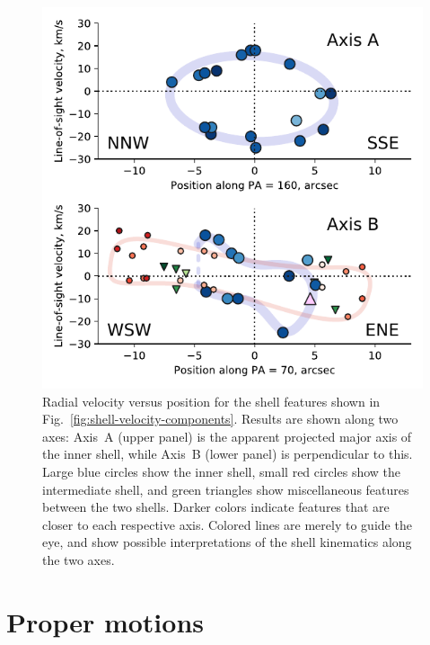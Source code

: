 \documentclass[useAMS, usenatbib]{mnras}
\begin{document}
\begin{figure}
  \centering
  \includegraphics[width=\linewidth]{figs/turtle-shell-velocity-axes-annotated}
  \caption{
    Radial velocity versus position
    for the shell features shown in Fig.~\ref{fig:shell-velocity-components}.
    Results are shown along two axes:
    Axis~A (upper panel) is the apparent projected major axis of the inner shell,
    while Axis~B (lower panel) is perpendicular to this.
    Large blue circles show the inner shell,
    small red circles show the intermediate shell,
    and green triangles show miscellaneous features between the two shells.
    Darker colors indicate features that are closer to each respective axis.
    Colored lines are merely to guide the eye,
    and show possible interpretations of the shell kinematics along the two axes.
  }
  \label{fig:shell-velocity-axes}
\end{figure}


\section{Proper motions}
\label{sec:proper-motions}
\end{document}
